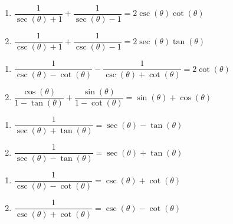 \begin{multicols}{2}

\begin{enumerate}

\setcounter{enumi}{\value{HW}}

\item  $\dfrac{1}{\sec(\theta) + 1} + \dfrac{1}{\sec(\theta)-1} = 2 \csc(\theta) \cot(\theta)$
\item  $\dfrac{1}{\csc(\theta) + 1} + \dfrac{1}{\csc(\theta)-1} = 2 \sec(\theta) \tan(\theta)$

\setcounter{HW}{\value{enumi}}

\end{enumerate}

\end{multicols}

\begin{multicols}{2}

\begin{enumerate}

\setcounter{enumi}{\value{HW}}
\small
\item $\dfrac{1}{\csc(\theta)-\cot(\theta)} - \dfrac{1}{\csc(\theta) + \cot(\theta)} = 2 \cot(\theta)$
\item $\dfrac{\cos(\theta)}{1 - \tan(\theta)} + \dfrac{\sin(\theta)}{1 - \cot(\theta)} = \sin(\theta) + \cos(\theta)$
\normalsize
\setcounter{HW}{\value{enumi}}

\end{enumerate}

\end{multicols}

\begin{multicols}{2}

\begin{enumerate}

\setcounter{enumi}{\value{HW}}

\item $\dfrac{1}{\sec(\theta) + \tan(\theta)} = \sec(\theta) - \tan(\theta)$
\item  $\dfrac{1}{\sec(\theta) - \tan(\theta)} = \sec(\theta) + \tan(\theta)$

\setcounter{HW}{\value{enumi}}

\end{enumerate}

\end{multicols}

\begin{multicols}{2}

\begin{enumerate}

\setcounter{enumi}{\value{HW}}

\item  $\dfrac{1}{\csc(\theta) - \cot(\theta)} = \csc(\theta) + \cot(\theta)$
\item  $\dfrac{1}{\csc(\theta) + \cot(\theta)} = \csc(\theta) - \cot(\theta)$

\setcounter{HW}{\value{enumi}}

\end{enumerate}

\end{multicols}

